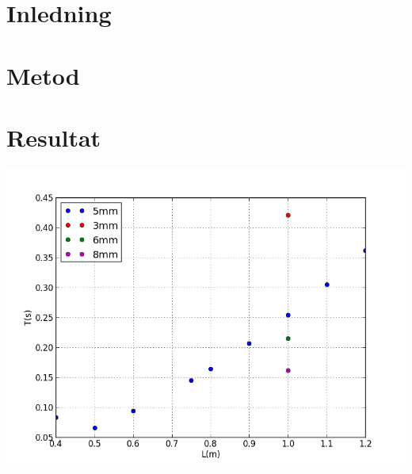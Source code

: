 \documentclass[10pt, titlepage, oneside, a4paper]{article}
\begin{document}
    
	\section{Inledning}
	\section{Metod}
	\section{Resultat}
    \begin{center}
        \includegraphics[scale=.5]{./plot.png}
    \end{center}
\end{document}
